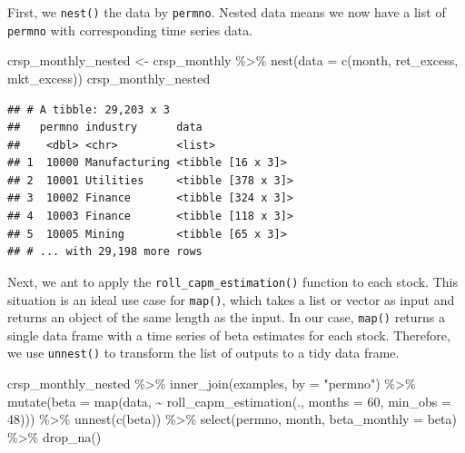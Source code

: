 \documentclass[
]{krantz}
\newenvironment{Shaded}{\begin{snugshade}}{\end{snugshade}}
\newcommand{\AttributeTok}[1]{\textcolor[rgb]{0.61,0.61,0.61}{#1}}
\newcommand{\DecValTok}[1]{\textcolor[rgb]{0.06,0.06,0.06}{#1}}
\newcommand{\FunctionTok}[1]{\textcolor[rgb]{0,0,0}{#1}}
\newcommand{\NormalTok}[1]{#1}
\newcommand{\OtherTok}[1]{\textcolor[rgb]{0.37,0.37,0.37}{#1}}
\newcommand{\SpecialCharTok}[1]{\textcolor[rgb]{0,0,0}{#1}}
\newcommand{\StringTok}[1]{\textcolor[rgb]{0.5,0.5,0.5}{#1}}
\begin{document}
First, we \texttt{nest()} the data by \texttt{permno}. Nested data means we now have a list of \texttt{permno} with corresponding time series data.

\begin{Shaded}
\begin{Highlighting}[]
\NormalTok{crsp\_monthly\_nested }\OtherTok{\textless{}{-}}\NormalTok{ crsp\_monthly }\SpecialCharTok{\%\textgreater{}\%}
  \FunctionTok{nest}\NormalTok{(}\AttributeTok{data =} \FunctionTok{c}\NormalTok{(month, ret\_excess, mkt\_excess))}
\NormalTok{crsp\_monthly\_nested}
\end{Highlighting}
\end{Shaded}

\begin{verbatim}
## # A tibble: 29,203 x 3
##   permno industry      data              
##    <dbl> <chr>         <list>            
## 1  10000 Manufacturing <tibble [16 x 3]> 
## 2  10001 Utilities     <tibble [378 x 3]>
## 3  10002 Finance       <tibble [324 x 3]>
## 4  10003 Finance       <tibble [118 x 3]>
## 5  10005 Mining        <tibble [65 x 3]> 
## # ... with 29,198 more rows
\end{verbatim}

Next, we ant to apply the \texttt{roll\_capm\_estimation()} function to each stock. This situation is an ideal use case for \texttt{map()}, which takes a list or vector as input and returns an object of the same length as the input. In our case, \texttt{map()} returns a single data frame with a time series of beta estimates for each stock. Therefore, we use \texttt{unnest()} to transform the list of outputs to a tidy data frame.

\begin{Shaded}
\begin{Highlighting}[]
\NormalTok{crsp\_monthly\_nested }\SpecialCharTok{\%\textgreater{}\%}
  \FunctionTok{inner\_join}\NormalTok{(examples, }\AttributeTok{by =} \StringTok{"permno"}\NormalTok{) }\SpecialCharTok{\%\textgreater{}\%}
  \FunctionTok{mutate}\NormalTok{(}\AttributeTok{beta =} \FunctionTok{map}\NormalTok{(data, }\SpecialCharTok{\textasciitilde{}} \FunctionTok{roll\_capm\_estimation}\NormalTok{(., }\AttributeTok{months =} \DecValTok{60}\NormalTok{, }\AttributeTok{min\_obs =} \DecValTok{48}\NormalTok{))) }\SpecialCharTok{\%\textgreater{}\%}
  \FunctionTok{unnest}\NormalTok{(}\FunctionTok{c}\NormalTok{(beta)) }\SpecialCharTok{\%\textgreater{}\%}
  \FunctionTok{select}\NormalTok{(permno, month, }\AttributeTok{beta\_monthly =}\NormalTok{ beta) }\SpecialCharTok{\%\textgreater{}\%}
  \FunctionTok{drop\_na}\NormalTok{()}
\end{Highlighting}
\end{Shaded}
\end{document}
